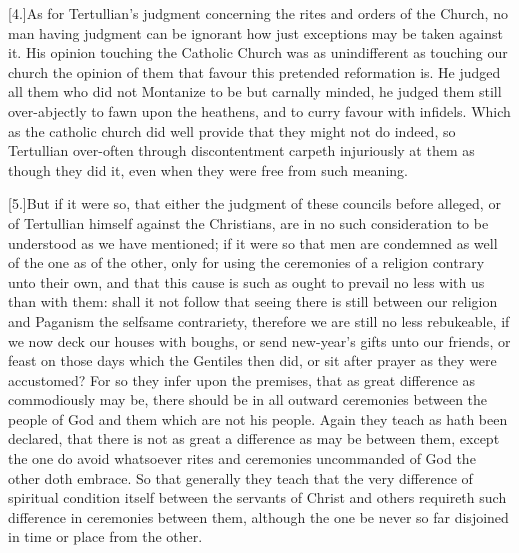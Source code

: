 [4.]As for Tertullian’s judgment concerning the rites and orders of the Church, no man having judgment can be ignorant how just exceptions may be taken against it. His opinion touching the Catholic Church was as unindifferent as touching our church the opinion of them that favour this pretended reformation is. He judged all them who did not Montanize to be but carnally minded, he judged them still over-abjectly to fawn upon the heathens, and to curry favour with infidels. Which as the catholic church did well provide that they might not do indeed, so Tertullian over-often through discontentment carpeth injuriously at them as though they did it, even when they were free from such meaning.

[5.]But if it were so, that either the judgment of these councils before alleged, or of Tertullian himself against the Christians, are in no such consideration to be understood as we have mentioned; if it were so that men are condemned as well of the one as of the other, only for using the ceremonies of a religion contrary unto their own, and that this cause is such as ought to prevail no less with us than with them: shall it not follow that seeing there is still between our religion and Paganism the selfsame contrariety, therefore we are still no less rebukeable, if we now deck our houses with boughs, or send new-year’s gifts unto our friends, or feast on those days which the Gentiles then did, or sit after prayer as they were accustomed? For so they infer upon the premises, that as great difference as commodiously may be, there should be in all outward ceremonies between the people of God and them which are not his people. Again they teach as hath been declared, that there is not as great a difference  as may be between them, except the one do avoid whatsoever rites and ceremonies uncommanded of God the other doth embrace. So that generally they teach that the very difference of spiritual condition itself between the servants of Christ and others requireth such difference in ceremonies between them, although the one be never so far disjoined in time or place from the other.

